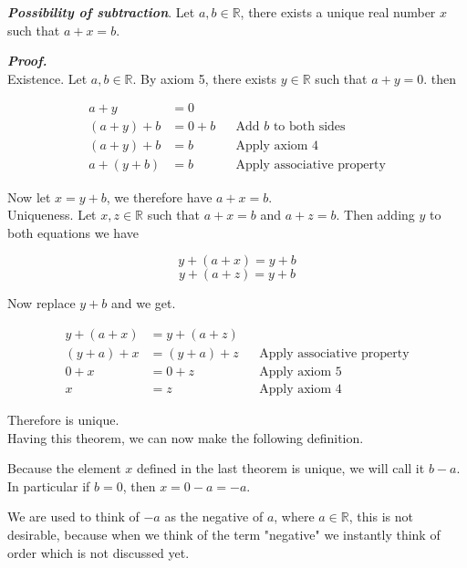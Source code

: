 \documentclass{report}
\begin{document}
    \begin{thBox}
        \textit{\textbf{Possibility of subtraction}}. Let $a,b \in \mathbb{R}$, there exists a unique real number $x$ such that $a+x=b$.
    \end{thBox}

    \textit{\textbf{Proof.}}\\

    Existence. Let $a, b \in \mathbb{R}$. By axiom 5, there exists $y \in \mathbb{R}$ such that $a+y = 0$. then

    \begin{align*}
        a+y &= 0\\
        (a+y) + b &= 0 +b &&\text{Add } b \text{ to both sides}\\
        (a+y) + b &= b &&\text{Apply axiom 4}\\
        a+(y+b) &= b && \text{Apply associative property}
    \end{align*}

    Now let $x = y+b$, we therefore have $a+x=b$.\\

    Uniqueness. Let $x,z \in \mathbb{R}$ such that $a+x=b$ and $a+z=b$. Then adding $y$ to both equations we have

    $$y+(a+x)=y+b$$
    $$y+(a+z)=y+b$$

    Now replace $y+b$ and we get.

    \begin{align*}
        y+(a+x) &= y+(a+z)\\
        (y+a)+x &= (y+a)+z && \text{Apply associative property}\\
        0+x &= 0+z && \text{Apply axiom 5}\\
        x &= z && \text{Apply axiom 4}
    \end{align*}

    Therefore is unique.\\

    Having this theorem, we can now make the following definition.

    \begin{defBox}
        Because the element $x$ defined in the last theorem is unique, we will call it $b-a$. In particular if $b=0$, then $x=0-a=-a$.
    \end{defBox}

    \begin{asideBox}
        We are used to think of $-a$ as the negative of $a$, where $a \in \mathbb{R}$, this is not desirable, because when we think of the term "negative" we instantly think of order which is not discussed yet.
    \end{asideBox}
\end{document}
